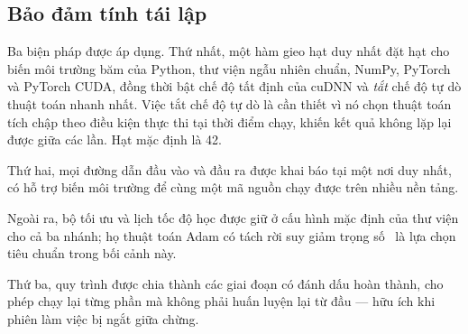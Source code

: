 \subsection{Bảo đảm tính tái lập}

Ba biện pháp được áp dụng. Thứ nhất, một hàm gieo hạt duy nhất đặt hạt cho biến môi trường băm của
Python, thư viện ngẫu nhiên chuẩn, NumPy, PyTorch~\cite{paszke2019pytorch} và PyTorch CUDA, đồng
thời bật chế độ tất định của cuDNN và \emph{tắt} chế độ tự dò thuật toán nhanh nhất. Việc tắt chế
độ tự dò là cần thiết vì nó chọn thuật toán tích chập theo điều kiện thực thi tại thời điểm chạy,
khiến kết quả không lặp lại được giữa các lần. Hạt mặc định là 42.

Thứ hai, mọi đường dẫn đầu vào và đầu ra được khai báo tại một nơi duy nhất, có hỗ trợ biến môi
trường để cùng một mã nguồn chạy được trên nhiều nền tảng.

Ngoài ra, bộ tối ưu và lịch tốc độ học được giữ ở cấu hình mặc định của thư viện cho cả ba nhánh;
họ thuật toán Adam có tách rời suy giảm trọng số~\cite{loshchilov2019adamw} là lựa chọn tiêu chuẩn
trong bối cảnh này.

Thứ ba, quy trình được chia thành các giai đoạn có đánh dấu hoàn thành, cho phép chạy lại từng phần
mà không phải huấn luyện lại từ đầu --- hữu ích khi phiên làm việc bị ngắt giữa chừng.
